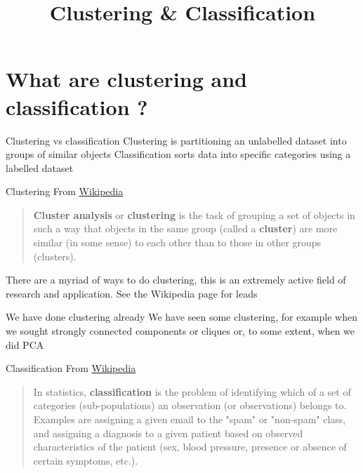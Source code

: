 \documentclass[aspectratio=169]{beamer}
\title{Clustering \& Classification}
\date{}
\begin{document}
\begin{frame}
	\titlepage
\end{frame}

\section{What are clustering and classification ?}

\begin{frame}{Clustering vs classification}
    Clustering is partitioning an unlabelled dataset into groups of similar objects
    \vfill
    Classification sorts data into specific categories using a labelled dataset
\end{frame}

\begin{frame}{Clustering}
    From \href{https://en.wikipedia.org/wiki/Cluster_analysis}{Wikipedia}
    \begin{quote}
        \textbf{Cluster analysis} or \textbf{clustering} is the task of grouping a set of objects in such a way that objects in the same group (called a \textbf{cluster}) are more similar (in some sense) to each other than to those in other groups (clusters).
    \end{quote}
    \vfill
    There are a myriad of ways to do clustering, this is an extremely active field of research and application. See the Wikipedia page for leads
\end{frame}


\begin{frame}{We have done clustering already}
    We have seen some clustering, for example when we sought strongly connected components or cliques or, to some extent, when we did PCA    
\end{frame}


\begin{frame}{Classification}
    From \href{https://en.wikipedia.org/wiki/Statistical_classification}{Wikipedia}
    \begin{quote}
        In statistics, \textbf{classification} is the problem of identifying which of a set of categories (sub-populations) an observation (or observations) belongs to. Examples are assigning a given email to the "spam" or "non-spam" class, and assigning a diagnosis to a given patient based on observed characteristics of the patient (sex, blood pressure, presence or absence of certain symptoms, etc.).
    \end{quote}
\end{frame}
\end{document}
